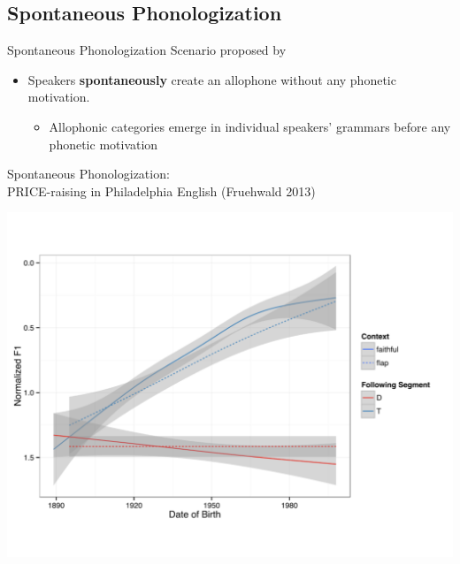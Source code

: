\documentclass[hyperref={pdfpagelabels=false}]{beamer}
\begin{document}
\subsection{Spontaneous Phonologization}

\begin{frame}{Spontaneous Phonologization}
	Scenario proposed by \citet{JandaJoseph2003, fruehwald2013} 
	
	\begin{itemize}
		\item Speakers \textbf{spontaneously} create an allophone without any phonetic motivation.  \\
		\begin{itemize}
			\item Allophonic categories emerge in individual speakers' grammars before any phonetic motivation
		\end{itemize}
	\end{itemize}
\end{frame}

\begin{frame}{Spontaneous Phonologization: \\ \small{PRICE-raising in Philadelphia English (Fruehwald 2013)}}

	
\begin{center}
\includegraphics[trim=2cm 2cm 2cm 2cm, clip=false, width=.8\textwidth]{ayraisingphila.pdf}
\end{center}

\end{frame}
\end{document}
